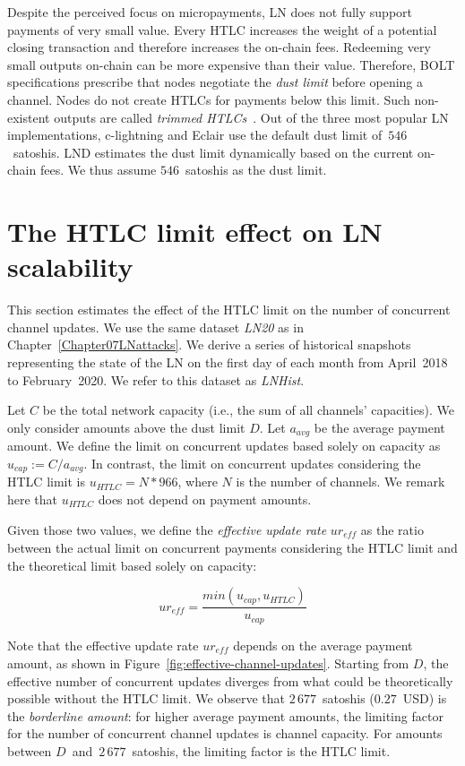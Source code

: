 Despite the perceived focus on micropayments, LN does not fully support payments of very small value.
Every HTLC increases the weight of a potential closing transaction and therefore increases the on-chain fees.
Redeeming very small outputs on-chain can be more expensive than their value.
Therefore, BOLT specifications prescribe that nodes negotiate the \textit{dust limit} before opening a channel.
Nodes do not create HTLCs for payments below this limit.
Such non-existent outputs are called \textit{trimmed HTLCs}~\cite{BOLT3Trimmed}.
Out of the three most popular LN implementations, c-lightning and Eclair use the default dust limit of~$546$~satoshis.
LND estimates the dust limit dynamically based on the current on-chain fees.
We thus assume $546$~satoshis as the dust limit.


\section{The HTLC limit effect on LN scalability}

This section estimates the effect of the HTLC limit on the number of concurrent channel updates.
We use the same dataset \textit{LN20} as in Chapter~\ref{Chapter07LNattacks}.
We derive a series of historical snapshots representing the state of the LN on the first day of each month from April~2018 to February~2020.
We refer to this dataset as \textit{LNHist}.

Let $C$ be the total network capacity (i.e., the sum of all channels' capacities).
We only consider amounts above the dust limit $D$.
Let $a_\textit{avg}$ be the average payment amount.
We define the limit on concurrent updates based solely on capacity as $u_\textit{cap} := C / a_\textit{avg}$.
In contrast, the limit on concurrent updates considering the HTLC limit is $u_\textit{HTLC} = N * 966$, where $N$ is the number of channels.
We remark here that $u_\textit{HTLC}$ does not depend on payment amounts.

Given those two values, we define the \textit{effective update rate} $ur_\textit{eff}$ as the ratio between the actual limit on concurrent payments considering the HTLC limit and the theoretical limit based solely on capacity:

\[ur_\textit{eff} = \frac{min(u_\textit{cap}, u_\textit{HTLC})}{u_\textit{cap}}\]

Note that the effective update rate $ur_\textit{eff}$ depends on the average payment amount, as shown in Figure~\ref{fig:effective-channel-updates}.
Starting from $D$, the effective number of concurrent updates diverges from what could be theoretically possible without the HTLC limit.
We observe that $2\,677$~satoshis ($0.27$~USD) is the \textit{borderline amount}: for higher average payment amounts, the limiting factor for the number of concurrent channel updates is channel capacity.
For amounts between $D$~and~$2\,677$~satoshis, the limiting factor is the HTLC limit.

